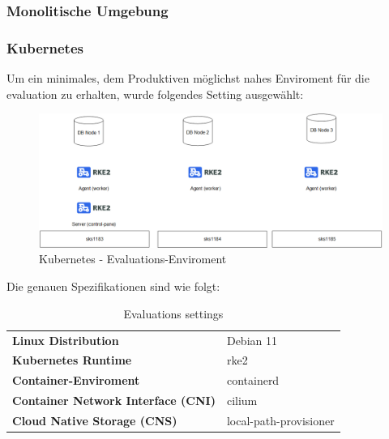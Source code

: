 
\subsubsection{Monolitische Umgebung}
\subsubsection{Kubernetes}
\begin{flushleft}
    Um ein minimales, dem Produktiven möglichst nahes Enviroment für die evaluation zu erhalten, wurde folgendes Setting ausgewählt:
    \begin{figure}[H]
        \centering
        \includegraphics[width=1\linewidth]{source/implementation/evaluation/platforms/evaluation_enviroment_rke2}
        \caption{Kubernetes - Evaluations-Enviroment}
        \label{fig:k8s_evalution_enviroment}
    \end{figure}
\end{flushleft}
\begin{flushleft}
    Die genauen Spezifikationen sind wie folgt:
    \begin{table}[H]
    \begin{tabular}{ll}
    \textbf{Linux Distribution}                & Debian 11              \\
    \textbf{Kubernetes Runtime}                & rke2                   \\
    \textbf{Container-Enviroment}              & containerd             \\
    \textbf{Container Network Interface (CNI)} & cilium                 \\
    \textbf{Cloud Native Storage (CNS)}        & local-path-provisioner
    \end{tabular}
    \caption{Evaluations settings}
    \label{tab:evaluation-setting}
    \end{table}
\end{flushleft}